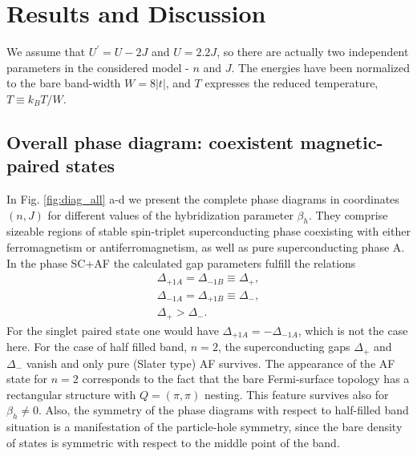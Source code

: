 \documentclass[aps,prb,showpacs,reprint]{revtex4-1}
\begin{document}

\section{Results and Discussion}\label{sec:reults}

We assume that $U^{\prime}=U-2J$ and $U=2.2J$, so
there are actually two independent parameters in the considered model - $n$ and
$J$.
The energies have been normalized to
the bare band-width $W=8|t|$, and $T$ expresses the reduced
temperature, $T\equiv k_BT/W$. 

\subsection{Overall phase diagram: coexistent magnetic-paired states}
In Fig. \ref{fig:diag_all} a-d we present the complete phase
diagrams in coordinates $(n,J)$ for different values of the hybridization parameter $\beta_h$. They comprise sizeable regions of stable spin-triplet
superconducting phase coexisting with
either ferromagnetism or antiferromagnetism, as well as pure superconducting
phase A. In the phase SC+AF the calculated gap parameters fulfill the relations
\begin{gather}
\Delta_{+1A}=\Delta_{-1B}\equiv \Delta_{+},\nonumber\\
\Delta_{-1A}=\Delta_{+1B}\equiv \Delta_{-},\\
\Delta_{+}>\Delta_{-}.\nonumber
\end{gather}
For the singlet paired state one would have $\Delta_{+1A}=-\Delta_{-1A}$, which is not
the case here. For the case of half filled band, $n=2$, the superconducting gaps
$\Delta_+$
and $\Delta_-$ vanish and only pure (Slater type) AF survives. The appearance of the AF state for $n=2$ corresponds to the fact that the bare Fermi-surface topology has a rectangular structure with $Q=(\pi, \pi)$ nesting. This feature survives also for $\beta_h\neq 0$. Also, the symmetry of the phase diagrams with respect to half-filled band situation is a manifestation
of the
particle-hole symmetry, since the bare density of states is symmetric with
respect to the middle point of the band.
\onecolumngrid
\end{document}
